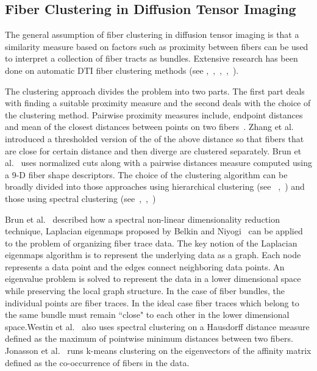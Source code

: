 \subsection {Fiber Clustering in Diffusion Tensor Imaging}
\label {subsec:fiberClus}
The general assumption of fiber clustering in diffusion tensor imaging is that a similarity measure based on factors such as proximity between fibers can be used to interpret a collection of fiber tracts as bundles. Extensive research has been done on automatic DTI fiber clustering methods (see \cite{Corouge2004},~\cite{Brun2003},~\cite{Brun2004},~\cite{Zhang2008},~\cite{westinMEDIA02}). 

The clustering approach divides the problem into two parts. The first part deals with finding a suitable proximity measure and the second deals with the choice of the clustering method. Pairwise proximity measures include, endpoint distances~\cite{Brun2003} and mean of the closest distances between points on two fibers~\cite{Corouge2004}. Zhang et al.~\cite{Zhang2008} introduced a thresholded version of the of the above distance so that fibers that are close for certain distance and then diverge are clustered separately. Brun et al.~\cite{Brun2004} uses normalized cuts along with a pairwise distances  measure computed using a 9-D fiber shape descriptors. The choice of the clustering algorithm can be broadly divided into those approaches using hierarchical clustering (see ~\cite{Moberts2005},~\cite{Zhang2008}) and those using spectral clustering (see~\cite{jonasson2005},~\cite{ODonnell2007},~\cite{Brun2004})
 
Brun et al.~\cite{Brun2003} described how a spectral non-linear dimensionality reduction technique,  Laplacian eigenmaps proposed by Belkin and Niyogi~\cite{Belkin01} can be applied to the problem of organizing fiber trace data. The key notion of the Laplacian eigenmaps algorithm is to represent the underlying data as a graph. Each node represents a data point and the edges connect neighboring data points. An eigenvalue problem is solved to represent the data in a lower dimensional space while preserving the local graph structure. In the case of fiber bundles, the individual points are fiber traces. In the ideal case fiber traces which belong to the same bundle must remain ``close" to each other in the lower dimensional space.Westin et al.~\cite{westinMEDIA02} also uses spectral clustering on a Hausdorff distance measure defined as the maximum of pointwise minimum distances between two fibers. Jonasson et al.~\cite{jonasson2005} runs k-means clustering on the eigenvectors of the affinity matrix defined as the co-occurrence of fibers in the data.


